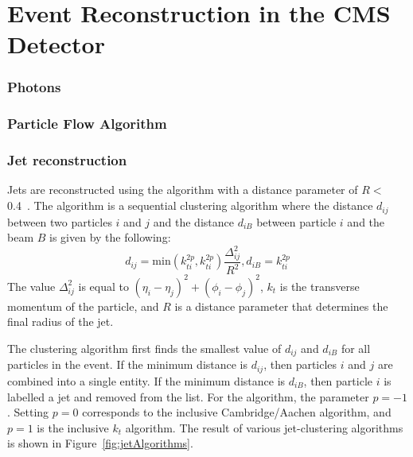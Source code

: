 \chapter{Event Reconstruction in the CMS Detector}
\label{sec:EventReconstruction}

\subsection{Photons}

\subsection{Particle Flow Algorithm}
\label{sec:ParticleFlow}

\subsection{Jet reconstruction}
\label{sec:Jet}
Jets are reconstructed using the \antikt algorithm with a distance parameter of $R <$ 0.4~\cite{antikt}.  The \antikt algorithm is a sequential clustering algorithm where the distance $d_{ij}$ between two particles $i$ and $j$ and the distance $d_{iB}$ between particle $i$ and the beam $B$ is given by the following: 
\begin{equation}
d_{ij} = \mathrm{min}(k_{ti}^{2p},k_{ti}^{2p})\frac{\Delta^2_{ij}}{R^2},
d_{iB} =k_{ti}^{2p}
\end{equation}
The value $\Delta^2_{ij}$ is equal to $(\eta_i - \eta_j)^2 + (\phi_i - \phi_j)^2$, $k_t$ is the transverse momentum of the particle, and $R$ is a distance parameter that determines the final radius of the jet.

The clustering algorithm first finds the smallest value of $d_{ij}$ and $d_{iB}$ for all particles in the event. If the minimum distance is $d_{ij}$, then particles $i$ and $j$ are combined into a single entity. If the minimum distance is $d_{iB}$, then particle $i$ is labelled a jet and removed from the list. For the \antikt algorithm, the parameter $p = -1$. Setting $p=0$ corresponds to the inclusive Cambridge/Aachen algorithm, and $p=1$ is the inclusive $k_t$ algorithm. The result of various jet-clustering algorithms is shown in Figure~\ref{fig:jetAlgorithms}.
 
